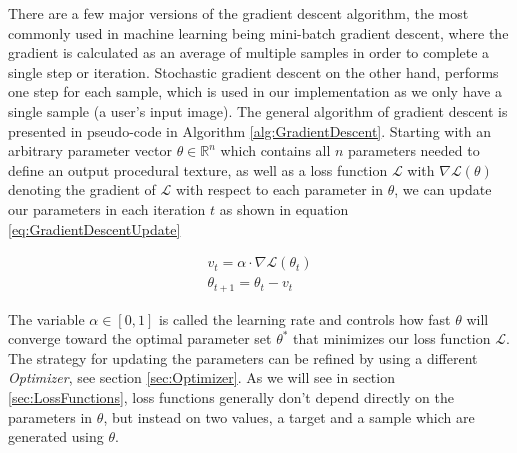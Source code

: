 There are a few major versions of the gradient descent algorithm, the most commonly used in machine learning being mini-batch gradient descent, where the gradient is calculated as an average of multiple samples in order to complete a single step or iteration. Stochastic gradient descent on the other hand, performs one step for each sample, which is used in our implementation as we only have a single sample (a user's input image). The general algorithm of gradient descent is presented in pseudo-code in Algorithm \ref{alg:GradientDescent}. Starting with an arbitrary parameter vector $\theta \in \mathbb{R}^n$ which contains all $n$ parameters needed to define an output procedural texture, as well as a loss function $\mathcal{L}$ with $\nabla \mathcal{L}(\theta)$ denoting the gradient of $\mathcal{L}$ with respect to each parameter in $\theta$, we can update our parameters in each iteration $t$ as shown in equation \ref{eq:GradientDescentUpdate}

\begin{equation}\label{eq:GradientDescentUpdate}
    \begin{aligned}
    v_t = \alpha \cdot \nabla \mathcal{L}(\theta_t) \\
    \theta_{t+1} = \theta_t - v_t
    \end{aligned}
\end{equation}

The variable $\alpha \in [0,1]$ is called the learning rate and controls how fast $\theta$ will converge toward the optimal parameter set $\theta^*$ that minimizes our loss function $\mathcal{L}$. The strategy for updating the parameters can be refined by using a different \textit{Optimizer}, see section \ref{sec:Optimizer}. As we will see in section \ref{sec:LossFunctions}, loss functions generally don't depend directly on the parameters in $\theta$, but instead on two values, a target and a sample which are generated using $\theta$. 


